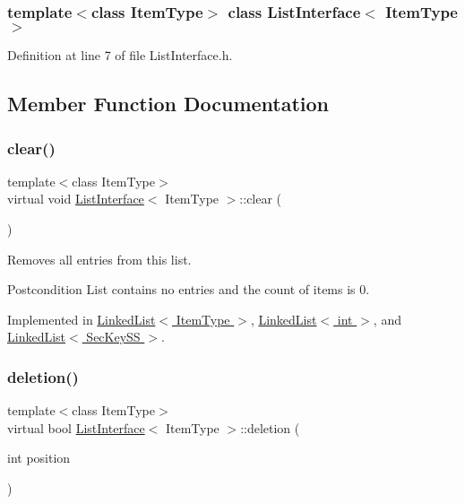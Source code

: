 \subsubsection*{template$<$class Item\+Type$>$\newline
class List\+Interface$<$ Item\+Type $>$}



Definition at line 7 of file List\+Interface.\+h.



\subsection{Member Function Documentation}
\mbox{\label{classListInterface_adfda414908b645bdf19bcab8269168b7}} 
\subsubsection{\texorpdfstring{clear()}{clear()}}
{\footnotesize\ttfamily template$<$class Item\+Type$>$ \\
virtual void \hyperlink{classListInterface}{List\+Interface}$<$ Item\+Type $>$\+::clear (\begin{DoxyParamCaption}{ }\end{DoxyParamCaption})\hspace{0.3cm}{\ttfamily [pure virtual]}}

Removes all entries from this list. \begin{DoxyPostcond}{Postcondition}
List contains no entries and the count of items is 0. 
\end{DoxyPostcond}


Implemented in \hyperlink{classLinkedList_a7d1d9cf83eef67b6c4d700a3cc5970e1}{Linked\+List$<$ Item\+Type $>$}, \hyperlink{classLinkedList_a7d1d9cf83eef67b6c4d700a3cc5970e1}{Linked\+List$<$ int $>$}, and \hyperlink{classLinkedList_a7d1d9cf83eef67b6c4d700a3cc5970e1}{Linked\+List$<$ Sec\+Key\+S\+S $>$}.

\mbox{\label{classListInterface_a68520ce2942ec716c745b1137c50a3c6}} 
\subsubsection{\texorpdfstring{deletion()}{deletion()}}
{\footnotesize\ttfamily template$<$class Item\+Type$>$ \\
virtual bool \hyperlink{classListInterface}{List\+Interface}$<$ Item\+Type $>$\+::deletion (\begin{DoxyParamCaption}\item[{int}]{position }\end{DoxyParamCaption})\hspace{0.3cm}{\ttfamily [pure virtual]}}


